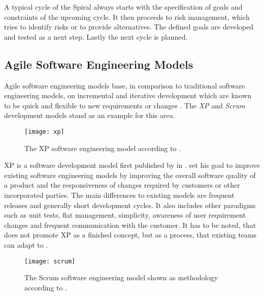 A typical cycle of the Spiral always starts with the specification of goals and
constraints of the upcoming cycle. It then proceeds to risk management, which
tries to identify risks or to provide alternatives. The defined goals are
developed and tested as a next step. Lastly the next cycle is planned.


\subsection{Agile Software Engineering Models} %

Agile software engineering models base, in comparison to traditional software
engineering models, on incremental and iterative development which are known to
be quick and flexible to new requirements or changes \cite{Beck1999}. The
\emph{\acl{XP}} and \emph{Scrum} development models stand as an example for
this area.

\begin{figure}[htbp]
  \centering
  \texttt{[image: xp]}
  \caption[\acl{XP} Model]
  {The \acl{XP} software engineering model according to \textcite{Beck1999a}.}
\end{figure}

\ac{XP} is a software development model first published by
\citeauthor{Beck1999} \cite{Beck1999a} in \citeyear{Beck1999}.
\citeauthor{Beck1999} set his goal to improve existing software engineering
models by improving the overall software quality of a product and the
responsiveness of changes required by customers or other incorporated parties.
The main differences to existing models are frequent releases and generally
short development cycles. It also includes other paradigms such as unit tests,
flat management, simplicity, awareness of user requirement changes and frequent
communication with the customer. It has to be noted, that \citeauthor{Beck1999}
does not promote \acl{XP} as a finished concept, but as a process, that
existing teams can adapt to \cite{Beck1999}.

\begin{figure}[htbp]
  \centering
  \texttt{[image: scrum]}
  \caption[Scrum Model]
  {The Scrum software engineering model shown as methodology according to
    \textcite{Schwaber1995}.}
\end{figure}

